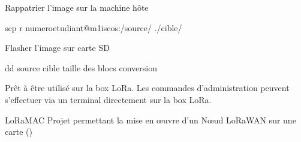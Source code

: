\documentclass[letterpaper,10pt,french]{sphinxmanual}
\begin{document}
Rappatrier l’image sur la machine hôte

\begin{sphinxVerbatim}[commandchars=\\\{\}]
scp \PYGZhy{}r numeroetudiant@m1\PYGZhy{}isc\PYGZhy{}os:/\PYGZlt{}source\PYGZgt{}/ ./\PYGZlt{}cible\PYGZgt{}/
\end{sphinxVerbatim}

Flasher l’image sur carte SD

\begin{sphinxVerbatim}[commandchars=\\\{\}]
dd \PYGZlt{}source\PYGZgt{} \PYGZlt{}cible\PYGZgt{} \PYGZlt{}taille des blocs\PYGZgt{}   \PYGZlt{}conversion\PYGZgt{}
\end{sphinxVerbatim}

Prêt à être utilisé sur la box LoRa. Les commandes d’administration peuvent s’effectuer via un terminal directement sur la box LoRa.

\begin{sphinxthebibliography}{LoRaMAC\sphinxhyphen{}}
Projet permettant la mise en œuvre d’un Nœud LoRaWAN sur une carte  ()
\end{sphinxthebibliography}



\renewcommand{\indexname}{Index}
\printindex
\end{document}
